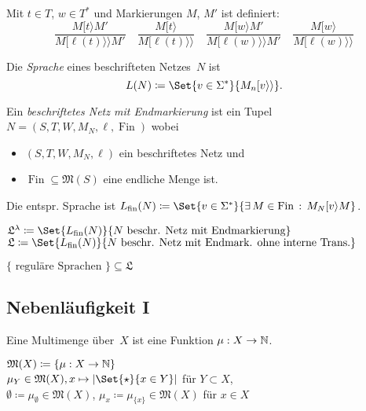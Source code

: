 \documentclass{cheat-sheet}
\newcommand{\activeTransition}[1]{[{#1}\rangle} %
\newcommand{\labelledTransition}[1]{[{#1}\rangle\rangle} %
\newcommand{\inferrule}[2]{\frac{{#1}}{{#2}}} %
\newcommand{\Markings}{\mathfrak{M}} %
\DeclareMathOperator{\Fin}{Fin} %
\newcommand{\Lang}{\mathfrak{L}} %
\newcommand{\fin}{\mathrm{fin}} %
\newcommand{\Multisets}{\mathfrak{M}} %
\begin{document}
\begin{defn}
  Mit $t \in T$, $w \in T^{*}$ und Markierungen $M$, $M'$ ist definiert:
  \[
    \inferrule
      {M \activeTransition{t} M'}
      {M \labelledTransition{\ell(t)} M'} \quad
    \inferrule
      {M \activeTransition{t}}
      {M \labelledTransition{\ell(t)}} \quad
    \inferrule
      {M \activeTransition{w} M'}
      {M \labelledTransition{\ell(w)} M'} \quad
    \inferrule
      {M \activeTransition{w}}
      {M \labelledTransition{\ell(w)}}
  \]
\end{defn}

\begin{defn}
  Die \emph{Sprache} eines beschrifteten Netzes~$N$ ist
  \[
    L(N) \coloneqq \Set{v \in \Sigma^{*}}{M_n \labelledTransition{v}}.
  \]
\end{defn}

\begin{defn}
  Ein \emph{beschriftetes Netz mit Endmarkierung} ist ein Tupel $N = (S, T, W, M_N, \ell, \Fin)$ wobei
  \begin{itemize}
    \item $(S, T, W, M_N, \ell)$ ein beschriftetes Netz und
    \item $\Fin \subseteq \Markings(S)$ eine endliche Menge ist.
  \end{itemize}
  Die entspr. Sprache ist $L_\fin(N) \coloneqq \Set{v \in \Sigma^{*}}{\ex{M \in \Fin} M_N \activeTransition{v} M}$.
\end{defn}

\begin{nota}
  $\Lang^\lambda \coloneqq \Set{L_\fin(N)}{N \text{ beschr. Netz mit Endmarkierung}}$ \\
  $\Lang \coloneqq \Set{L_\fin(N)}{N \text{ beschr. Netz mit Endmark. ohne interne Trans.}}$
\end{nota}

\begin{satz}
  $\{ \text{ reguläre Sprachen } \} \subseteq \Lang$
\end{satz}

\subsection{Nebenläufigkeit I}

\begin{defn}
  Eine Multimenge über~$X$ ist eine Funktion $\mu : X \to \mathbb{N}$.
\end{defn}

\begin{nota}
  \begin{minipage}[t]{0.8 \linewidth}
    $\Multisets(X) \coloneqq \{ \mu : X \to \N \}$ \\
    $\mu_Y \in \Multisets(X), x \mapsto \card{\Set{\star}{x \in Y}}$ für $Y \subset X$, \\
    $\emptyset \coloneqq \mu_\emptyset \in \Multisets(X)$, \enspace
    $\mu_x \coloneqq \mu_{\{ x \}} \in \Multisets(X)$ für $x \in X$
  \end{minipage}
\end{nota}
\end{document}
